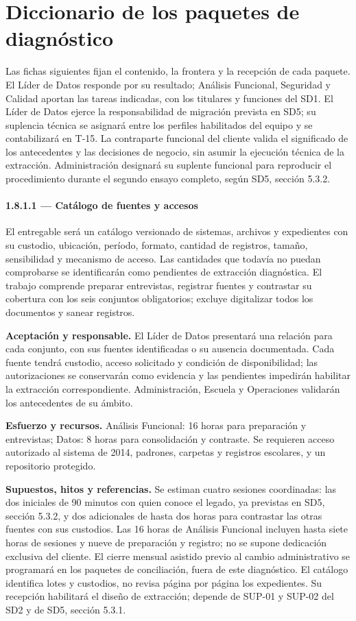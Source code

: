 \section{Diccionario de los paquetes de diagnóstico}
Las fichas siguientes fijan el contenido, la frontera y la recepción de cada paquete. El Líder de Datos responde por su resultado; Análisis Funcional, Seguridad y Calidad aportan las tareas indicadas, con los titulares y funciones del SD1. El Líder de Datos ejerce la responsabilidad de migración prevista en SD5; su suplencia técnica se asignará entre los perfiles habilitados del equipo y se contabilizará en T-15. La contraparte funcional del cliente valida el significado de los antecedentes y las decisiones de negocio, sin asumir la ejecución técnica de la extracción. Administración designará su suplente funcional para reproducir el procedimiento durante el segundo ensayo completo, según SD5, sección 5.3.2.

\paragraph*{1.8.1.1 --- Catálogo de fuentes y accesos}
El entregable será un catálogo versionado de sistemas, archivos y expedientes con su custodio, ubicación, período, formato, cantidad de registros, tamaño, sensibilidad y mecanismo de acceso. Las cantidades que todavía no puedan comprobarse se identificarán como pendientes de extracción diagnóstica. El trabajo comprende preparar entrevistas, registrar fuentes y contrastar su cobertura con los seis conjuntos obligatorios; excluye digitalizar todos los documentos y sanear registros.

\textbf{Aceptación y responsable.} El Líder de Datos presentará una relación para cada conjunto, con sus fuentes identificadas o su ausencia documentada. Cada fuente tendrá custodio, acceso solicitado y condición de disponibilidad; las autorizaciones se conservarán como evidencia y las pendientes impedirán habilitar la extracción correspondiente. Administración, Escuela y Operaciones validarán los antecedentes de su ámbito.

\textbf{Esfuerzo y recursos.} Análisis Funcional: 16 horas para preparación y entrevistas; Datos: 8 horas para consolidación y contraste. Se requieren acceso autorizado al sistema de 2014, padrones, carpetas y registros escolares, y un repositorio protegido. 

\textbf{Supuestos, hitos y referencias.} Se estiman cuatro sesiones coordinadas: las dos iniciales de 90 minutos con quien conoce el legado, ya previstas en SD5, sección 5.3.2, y dos adicionales de hasta dos horas para contrastar las otras fuentes con sus custodios. Las 16 horas de Análisis Funcional incluyen hasta siete horas de sesiones y nueve de preparación y registro; no se supone dedicación exclusiva del cliente. El cierre mensual asistido previo al cambio administrativo se programará en los paquetes de conciliación, fuera de este diagnóstico. El catálogo identifica lotes y custodios, no revisa página por página los expedientes. Su recepción habilitará el diseño de extracción; depende de SUP-01 y SUP-02 del SD2 y de SD5, sección 5.3.1.


